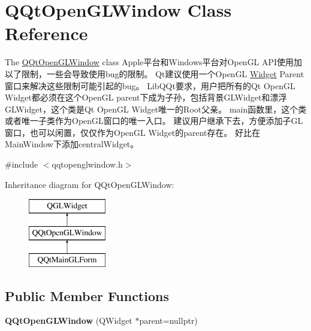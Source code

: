 \hypertarget{class_q_qt_open_g_l_window}{}\section{Q\+Qt\+Open\+G\+L\+Window Class Reference}
\label{class_q_qt_open_g_l_window}


The \mbox{\hyperlink{class_q_qt_open_g_l_window}{Q\+Qt\+Open\+G\+L\+Window}} class Apple平台和\+Windows平台对\+Open\+GL A\+P\+I使用加以了限制，一些会导致使用bug的限制。 Qt建议使用一个\+Open\+GL \mbox{\hyperlink{class_widget}{Widget}} Parent窗口来解决这些限制可能引起的bug。 Lib\+Q\+Qt要求，用户把所有的\+Qt Open\+GL Widget都必须在这个\+Open\+GL parent下成为子孙，包括背景\+G\+L\+Widget和漂浮\+G\+L\+Widget，这个类是\+Qt Open\+GL Widget唯一的\+Root父亲。 main函数里，这个类或者唯一子类作为\+Open\+G\+L窗口的唯一入口。 建议用户继承下去，方便添加子\+G\+L窗口，也可以闲置，仅仅作为\+Open\+GL Widget的parent存在。 好比在\+Main\+Window下添加central\+Widget。  




{\ttfamily \#include $<$qqtopenglwindow.\+h$>$}

Inheritance diagram for Q\+Qt\+Open\+G\+L\+Window\+:\begin{figure}[H]
\begin{center}
\leavevmode
\includegraphics[height=3.000000cm]{class_q_qt_open_g_l_window}
\end{center}
\end{figure}
\subsection*{Public Member Functions}
\begin{DoxyCompactItemize}
\item 
\mbox{\label{class_q_qt_open_g_l_window_a3be0358f0198ae754db88300f1362a97}} 
{\bfseries Q\+Qt\+Open\+G\+L\+Window} (Q\+Widget $\ast$parent=nullptr)
\end{DoxyCompactItemize}



